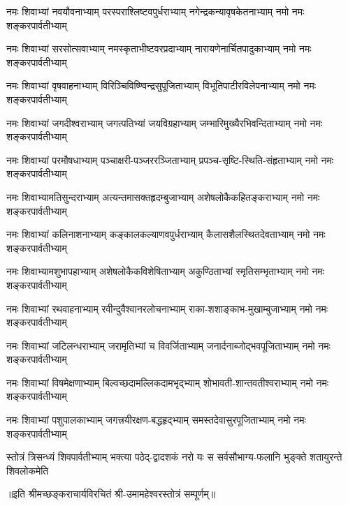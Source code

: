 

\fourlineindentedshloka
{नमः शिवाभ्यां नवयौवनाभ्याम्‌}
{परस्पराश्लिष्टवपुर्धराभ्याम्‌}
{नगेन्द्रकन्यावृषकेतनाभ्याम्‌}
{नमो नमः शङ्करपार्वतीभ्याम्‌}%

\fourlineindentedshloka
{नमः शिवाभ्यां सरसोत्सवाभ्याम्‌}
{नमस्कृताभीष्टवरप्रदाभ्याम्‌}
{नारायणेनार्चितपादुकाभ्याम्}
{नमो नमः शङ्करपार्वतीभ्याम्‌}%

\fourlineindentedshloka
{नमः शिवाभ्यां वृषवाहनाभ्याम्‌}
{विरिञ्चिविष्ण्विन्द्रसुपूजिताभ्याम्‌}
{विभूतिपाटीरविलेपनाभ्याम्‌}
{नमो नमः शङ्करपार्वतीभ्याम्‌}%

\fourlineindentedshloka
{नमः शिवाभ्यां जगदीश्वराभ्याम्}
{जगत्पतिभ्यां जयविग्रहाभ्याम्‌}
{जम्भारिमुख्यैरभिवन्दिताभ्याम्‌}
{नमो नमः शङ्करपार्वतीभ्याम्‌}%

\fourlineindentedshloka
{नमः शिवाभ्यां परमौषधाभ्याम्‌}
{पञ्चाक्षरी-पञ्जररञ्जिताभ्याम्‌}
{प्रपञ्च-सृष्टि-स्थिति-संहृताभ्याम्‌}
{नमो नमः शङ्करपार्वतीभ्याम्‌}%

\fourlineindentedshloka
{नमः शिवाभ्यामतिसुन्दराभ्याम्‌}
{अत्यन्तमासक्तहृदम्बुजाभ्याम्‌}
{अशेषलोकैकहितङ्कराभ्याम्‌}
{नमो नमः शङ्करपार्वतीभ्याम्‌}%

\fourlineindentedshloka
{नमः शिवाभ्यां कलिनाशनाभ्याम्‌}
{कङ्कालकल्याणवपुर्धराभ्याम्‌}
{कैलासशैलस्थितदेवताभ्याम्‌}
{नमो नमः शङ्करपार्वतीभ्याम्‌}%

\fourlineindentedshloka
{नमः शिवाभ्यामशुभापहाभ्याम्‌}
{अशेषलोकैकविशेषिताभ्याम्‌}
{अकुण्ठिताभ्यां स्मृतिसम्भृताभ्याम्‌}
{नमो नमः शङ्करपार्वतीभ्याम्‌}%

\fourlineindentedshloka
{नमः शिवाभ्यां रथवाहनाभ्याम्‌}
{रवीन्दुवैश्वानरलोचनाभ्याम्‌}
{राका-शशाङ्काभ-मुखाम्बुजाभ्याम्‌}
{नमो नमः शङ्करपार्वतीभ्याम्‌}%

\fourlineindentedshloka
{नमः शिवाभ्यां जटिलन्धराभ्याम्‌}
{जरामृतिभ्यां च विवर्जिताभ्याम्‌}
{जनार्दनाब्जोद्भवपूजिताभ्याम्‌}
{नमो नमः शङ्करपार्वतीभ्याम्‌}%

\fourlineindentedshloka
{नमः शिवाभ्यां विषमेक्षणाभ्याम्‌}
{बिल्वच्छदामल्लिकदामभृद्‌भ्याम्‌}
{शोभावती-शान्तवतीश्वराभ्याम्‌}
{नमो नमः शङ्करपार्वतीभ्याम्‌}%

\fourlineindentedshloka
{नमः शिवाभ्यां पशुपालकाभ्याम्‌}
{जगत्त्रयीरक्षण-बद्धहृद्‌भ्याम्‌}
{समस्तदेवासुरपूजिताभ्याम्‌}
{नमो नमः शङ्करपार्वतीभ्याम्‌}%

\fourlineindentedshloka
{स्तोत्रं त्रिसन्ध्यं शिवपार्वतीभ्याम्‌}
{भक्त्या पठेद्-द्वादशकं नरो यः}
{स सर्वसौभाग्य-फलानि भुङ्क्ते}
{शतायुरन्ते शिवलोकमेति}%

{॥इति श्रीमच्छङ्कराचार्यविरचितं श्री-उमामहेश्वरस्तोत्रं सम्पूर्णम्‌॥}